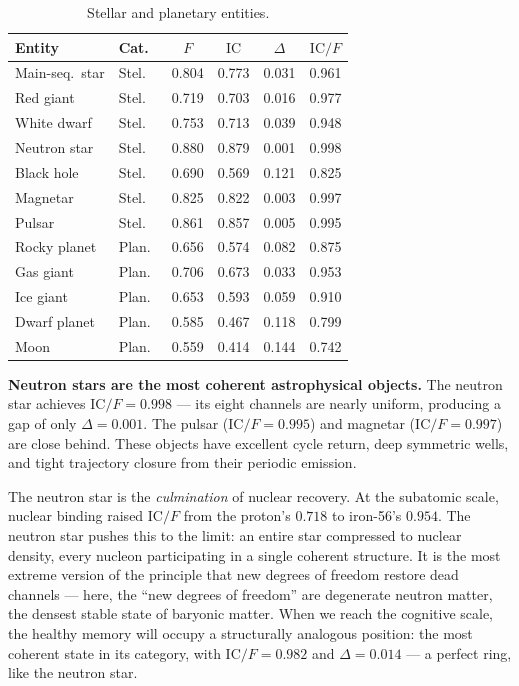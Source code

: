 \documentclass[
  aps,
  prd,
  twocolumn,
  superscriptaddress,
  nofootinbib,
  floatfix
]{revtex4-2}
\newcommand{\IC}{\mathrm{IC}}
\begin{document}
\begin{table}[t]
\caption{\label{tab:stellar}Stellar and planetary entities.}
\begin{ruledtabular}
\begin{tabular}{llcccc}
Entity & Cat.\ & $F$ & $\IC$ & $\Delta$ & $\IC/F$ \\
\hline
Main-seq.\ star   & Stel.\ & 0.804 & 0.773 & 0.031 & 0.961 \\
Red giant          & Stel.\ & 0.719 & 0.703 & 0.016 & 0.977 \\
White dwarf        & Stel.\ & 0.753 & 0.713 & 0.039 & 0.948 \\
Neutron star       & Stel.\ & 0.880 & 0.879 & 0.001 & 0.998 \\
Black hole         & Stel.\ & 0.690 & 0.569 & 0.121 & 0.825 \\
Magnetar           & Stel.\ & 0.825 & 0.822 & 0.003 & 0.997 \\
Pulsar             & Stel.\ & 0.861 & 0.857 & 0.005 & 0.995 \\
\hline
Rocky planet       & Plan.\ & 0.656 & 0.574 & 0.082 & 0.875 \\
Gas giant          & Plan.\ & 0.706 & 0.673 & 0.033 & 0.953 \\
Ice giant          & Plan.\ & 0.653 & 0.593 & 0.059 & 0.910 \\
Dwarf planet       & Plan.\ & 0.585 & 0.467 & 0.118 & 0.799 \\
Moon               & Plan.\ & 0.559 & 0.414 & 0.144 & 0.742 \\
\end{tabular}
\end{ruledtabular}
\end{table}

\textbf{Neutron stars are the most coherent astrophysical
objects.}
The neutron star achieves $\IC/F = 0.998$ --- its eight
channels are nearly uniform, producing a gap of only
$\Delta = 0.001$.  The pulsar ($\IC/F = 0.995$) and magnetar
($\IC/F = 0.997$) are close behind.  These objects have
excellent cycle return, deep symmetric wells, and tight
trajectory closure from their periodic emission.

The neutron star is the \emph{culmination} of nuclear
recovery.  At the subatomic scale, nuclear binding raised
$\IC/F$ from the proton's $0.718$ to iron-56's $0.954$.
The neutron star pushes this to the limit: an entire star
compressed to nuclear density, every nucleon participating
in a single coherent structure.  It is the most extreme
version of the principle that new degrees of freedom restore
dead channels --- here, the ``new degrees of freedom'' are
degenerate neutron matter, the densest stable state of baryonic
matter.  When we reach the cognitive scale, the healthy memory
will occupy a structurally analogous position: the most
coherent state in its category, with $\IC/F = 0.982$ and
$\Delta = 0.014$ --- a perfect ring, like the neutron star.
\end{document}
